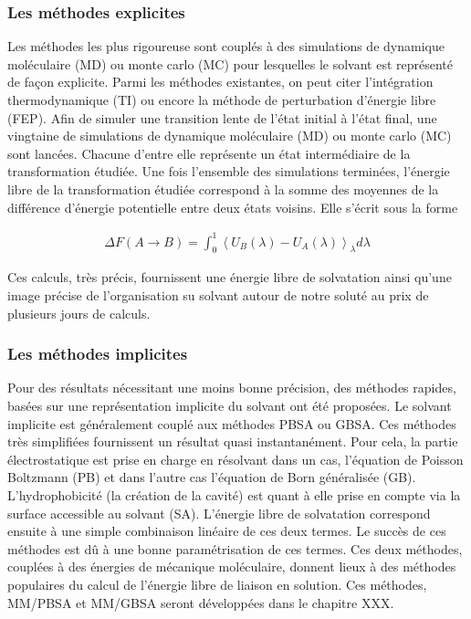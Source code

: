 \subsubsection{Les méthodes explicites}
Les méthodes les plus rigoureuse sont couplés à des simulations de dynamique moléculaire (MD) ou monte carlo (MC) pour lesquelles le solvant est représenté de façon explicite. Parmi les méthodes existantes\cite{Skyner_review_2015, Hansen_Practical_2014, Christ_basic_2009}, on peut citer l'intégration thermodynamique (TI) ou encore la méthode de perturbation d'énergie libre (FEP). Afin de simuler une transition lente de l'état initial à l'état final, une vingtaine de simulations de dynamique moléculaire (MD) ou monte carlo (MC) sont lancées. Chacune d'entre elle représente un état intermédiaire de la transformation étudiée. Une fois l'ensemble des simulations terminées, l'énergie libre de la transformation étudiée correspond à la somme des moyennes de la différence d'énergie potentielle entre deux états voisins. Elle s'écrit sous la forme

\begin{eqnarray}
\Delta F(A \rightarrow B) =  \int_0^1 \left\langle U_B(\lambda) - U_A(\lambda) \right\rangle_{\lambda} d\lambda
\end{eqnarray}

Ces calculs, très précis, fournissent une énergie libre de solvatation ainsi qu'une image précise de l'organisation su solvant autour de notre soluté au prix de plusieurs jours de calculs.



\subsubsection{Les méthodes implicites}
Pour des résultats nécessitant une moins bonne précision, des méthodes rapides, basées sur une représentation implicite du solvant ont été proposées\cite{Skyner_review_2015}. Le solvant implicite est généralement couplé aux méthodes PBSA ou GBSA. Ces méthodes très simplifiées fournissent un résultat quasi instantanément. Pour cela, la partie électrostatique est prise en charge en résolvant dans un cas, l'équation de Poisson Boltzmann (PB) et dans l'autre cas l'équation de Born généralisée (GB). L'hydrophobicité (la création de la cavité) est quant à elle prise en compte via la surface accessible au solvant (SA). L'énergie libre de solvatation correspond ensuite à une simple combinaison linéaire de ces deux termes. Le succès de ces méthodes est dû à une bonne paramétrisation de ces termes. Ces deux méthodes, couplées à des énergies de mécanique moléculaire, donnent lieux à des méthodes  populaires du calcul de l'énergie libre de liaison en solution. Ces méthodes, MM/PBSA\cite{Genheden__MMPBSA_2015} et MM/GBSA seront développées dans le chapitre XXX.

